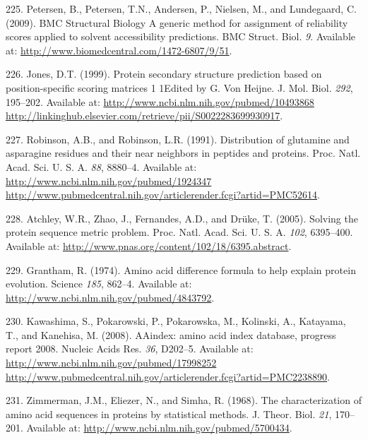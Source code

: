 \documentclass[11pt,a4paper,twoside]{book}
\theoremstyle{definition}
\theoremstyle{definition}
\theoremstyle{remark}
\begin{document}
\hypertarget{ref-Petersen2009a}{}
225. Petersen, B., Petersen, T.N., Andersen, P., Nielsen, M., and
Lundegaard, C. (2009). BMC Structural Biology A generic method for
assignment of reliability scores applied to solvent accessibility
predictions. BMC Struct. Biol. \emph{9}. Available at:
\url{http://www.biomedcentral.com/1472-6807/9/51}.

\hypertarget{ref-Jones1999}{}
226. Jones, D.T. (1999). Protein secondary structure prediction based on
position-specific scoring matrices 1 1Edited by G. Von Heijne. J. Mol.
Biol. \emph{292}, 195--202. Available at:
\href{http://www.ncbi.nlm.nih.gov/pubmed/10493868\%20http://linkinghub.elsevier.com/retrieve/pii/S0022283699930917}{http://www.ncbi.nlm.nih.gov/pubmed/10493868 http://linkinghub.elsevier.com/retrieve/pii/S0022283699930917}.

\hypertarget{ref-Robinson1991}{}
227. Robinson, A.B., and Robinson, L.R. (1991). Distribution of
glutamine and asparagine residues and their near neighbors in peptides
and proteins. Proc. Natl. Acad. Sci. U. S. A. \emph{88}, 8880--4.
Available at:
\href{http://www.ncbi.nlm.nih.gov/pubmed/1924347\%20http://www.pubmedcentral.nih.gov/articlerender.fcgi?artid=PMC52614}{http://www.ncbi.nlm.nih.gov/pubmed/1924347 http://www.pubmedcentral.nih.gov/articlerender.fcgi?artid=PMC52614}.

\hypertarget{ref-Atchley2005}{}
228. Atchley, W.R., Zhao, J., Fernandes, A.D., and Drüke, T. (2005).
Solving the protein sequence metric problem. Proc. Natl. Acad. Sci. U.
S. A. \emph{102}, 6395--400. Available at:
\url{http://www.pnas.org/content/102/18/6395.abstract}.

\hypertarget{ref-Grantham1974}{}
229. Grantham, R. (1974). Amino acid difference formula to help explain
protein evolution. Science \emph{185}, 862--4. Available at:
\url{http://www.ncbi.nlm.nih.gov/pubmed/4843792}.

\hypertarget{ref-Kawashima2008}{}
230. Kawashima, S., Pokarowski, P., Pokarowska, M., Kolinski, A.,
Katayama, T., and Kanehisa, M. (2008). AAindex: amino acid index
database, progress report 2008. Nucleic Acids Res. \emph{36}, D202--5.
Available at:
\href{http://www.ncbi.nlm.nih.gov/pubmed/17998252\%20http://www.pubmedcentral.nih.gov/articlerender.fcgi?artid=PMC2238890}{http://www.ncbi.nlm.nih.gov/pubmed/17998252 http://www.pubmedcentral.nih.gov/articlerender.fcgi?artid=PMC2238890}.

\hypertarget{ref-Zimmerman1968}{}
231. Zimmerman, J.M., Eliezer, N., and Simha, R. (1968). The
characterization of amino acid sequences in proteins by statistical
methods. J. Theor. Biol. \emph{21}, 170--201. Available at:
\url{http://www.ncbi.nlm.nih.gov/pubmed/5700434}.
\end{document}
